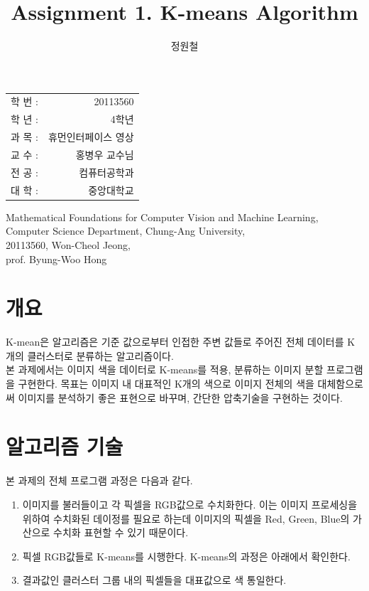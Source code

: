 \documentclass{oblivoir}
\title{Assignment 1.
	K-means Algorithm}
\author{정원철}
\begin{document}
\maketitle
\begin{center}
\begin{tabular}{l r}
	학 번 : & 20113560 \\
	학 년 : & 4학년 \\
	과 목 : & 휴먼인터페이스 영상 \\
	교 수 : & 홍병우 교수님 \\
	전 공 : & 컴퓨터공학과 \\
	대 학 : & 중앙대학교
\end{tabular}
\end{center}
\begin{flushright}
	\begin{center}
 Mathematical Foundations for Computer Vision and Machine Learning,\\
 Computer Science Department, Chung-Ang University,\\
 20113560, Won-Cheol Jeong,\\
 prof. Byung-Woo Hong
 	\end{center}
\end{flushright}

\tableofcontents
\newpage


\section{개요 \label{ss:add}}
K-mean은 알고리즘은 기준 값으로부터 인접한 주변 값들로 주어진 전체 데이터를 K개의 클러스터로 분류하는 알고리즘이다.\\

본 과제에서는 이미지 색을 데이터로 K-means를 적용, 분류하는 이미지 분할 프로그램을 구현한다. 목표는 이미지 내 대표적인 K개의 색으로 이미지 전체의 색을 대체함으로써 이미지를 분석하기 좋은 표현으로 바꾸며, 간단한 압축기술을 구현하는 것이다.

\section{알고리즘 기술 \label{ss:add}}
본 과제의 전체 프로그램 과정은 다음과 같다.
\begin{enumerate}
	\item 이미지를 불러들이고 각 픽셀을 RGB값으로 수치화한다. 이는 이미지 프로세싱을 위하여 수치화된 데이정를 필요로 하는데 이미지의 픽셀을 Red, Green, Blue의 가산으로 수치화 표현할 수 있기 때문이다.
	\item 픽셀 RGB값들로 K-means를 시행한다. K-means의 과정은 아래에서 확인한다.
	\item 결과값인 클러스터 그룹 내의 픽셀들을 대표값으로 색 통일한다.\\
\end{enumerate}
\end{document}
